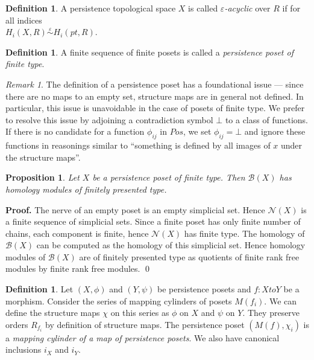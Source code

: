\documentclass[english,12pt]{article}
\newcounter{stmcounter}[section]
\numberwithin{equation}{section}
\newtheorem{proposition}[stmcounter]{Proposition}
\theoremstyle{definition}
\newtheorem{definition}[stmcounter]{Definition}
\theoremstyle{remark}
\newtheorem{remark}[stmcounter]{Remark}
\newenvironment{pf}{\noindent\textbf{Proof.}}{\qed}
\newcommand{\define}[1]{{\textit{#1}}}
\begin{document}
\begin{definition}
  A persistence topological space $X$ is called \define{$\varepsilon$-acyclic} over $R$ if for all indices\\ $H_i(X,R) \stackrel{\varepsilon}{\sim} H_i(pt,R)$.
\end{definition}

\begin{definition}
  A finite sequence of finite posets is called a \define{persistence poset of finite type}.
\end{definition}

\begin{remark}
  The definition of a persistence poset has a foundational issue --- since there are no maps to an empty set, structure maps are in general not defined. In particular, this issue is unavoidable in the case of posets of finite type. We prefer to resolve this issue by adjoining a contradiction symbol $\bot$ to a class of functions. If there is no candidate for a function $\phi_{ij}$ in $Pos$, we set $\phi_{ij} = \bot$ and ignore these functions in reasonings similar to ``something is defined by all images of $x$ under the structure maps''.
\end{remark}

\begin{proposition}
  Let $X$ be a persistence poset of finite type. Then $\mathcal{B}(X)$ has homology modules of finitely presented type.
\end{proposition}

\begin{pf}
  The nerve of an empty poset is an empty simplicial set. Hence $\mathcal{N}(X)$ is a finite sequence of simplicial sets. Since a finite poset has only finite number of chains, each component is finite, hence $\mathcal{N}(X)$ has finite type. The homology of $\mathcal{B}(X)$ can be computed as the homology of this simplicial set. Hence homology modules of $\mathcal{B}(X)$ are of finitely presented type as quotients of finite rank free modules by finite rank free modules.
\end{pf}\\

\begin{definition}
  Let $(X, \phi)$ and $(Y, \psi)$ be persistence posets and $f : X to Y$ be a morphism. Consider the series of mapping cylinders of posets $M(f_i)$. We can define the structure maps $\chi$ on this series as $\phi$ on $X$ and $\psi$ on $Y$. They preserve orders $R_{f_i}$ by definition of structure maps. The persistence poset $(M(f), \chi_i)$ is a \define{mapping cylinder of a map of persistence posets}. We also have canonical inclusions $i_X$ and $i_Y$.
\end{definition}
\end{document}
